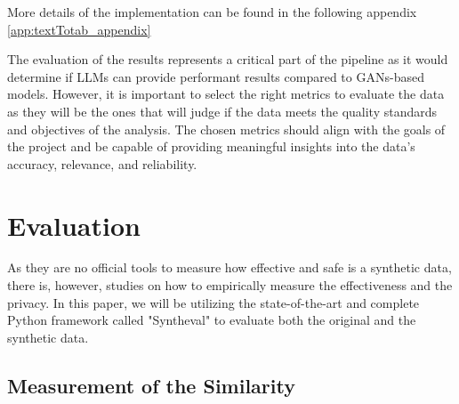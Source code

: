 More details of the implementation can be found in the following appendix \ref{app:textTotab_appendix}














The evaluation of the results represents a critical part of the pipeline as it would determine if LLMs can provide performant results compared to GANs-based models.
However, it is important to select the right metrics to evaluate the data as they will be the ones that will judge if the data meets the quality standards and objectives of the analysis. The chosen metrics should align with the goals of the project and be capable of providing meaningful insights into the data's accuracy, relevance, and reliability.

\section{Evaluation}


As they are no official tools to measure how effective and safe is a synthetic data, there is, however, studies on how to empirically measure the effectiveness and the privacy. In this paper, we will be utilizing the state-of-the-art and complete Python framework called "Syntheval" to evaluate both the original and the synthetic data. %


\subsection{Measurement of the Similarity}


